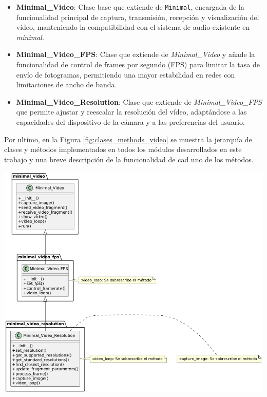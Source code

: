 \begin{itemize}
    \item \textbf{Minimal\_Video}: Clase base que extiende de \texttt{Minimal}, encargada de la funcionalidad principal de captura, transmisión, recepción y visualización del vídeo, manteniendo la compatibilidad con el sistema de audio existente en \textit{minimal}.
    \item \textbf{Minimal\_Video\_FPS}: Clase que extiende de \textit{Minimal\_Video} y añade la funcionalidad de control de frames por segundo (FPS) para limitar la tasa de envío de fotogramas, permitiendo una mayor estabilidad en redes con limitaciones de ancho de banda.
    \item \textbf{Minimal\_Video\_Resolution}: Clase que extiende de \textit{Minimal\_Video\_FPS} que permite ajustar y reescalar la resolución del vídeo, adaptándose a las capacidades del dispositivo de la cámara y a las preferencias del usuario.
\end{itemize}
\vspace{\baselineskip}

Por ultimo, en la Figura \ref{fig:clases_methods_video} se muestra la jerarquía de clases y métodos implementados en todos los módulos desarrollados en este trabajo y una breve descripción de la funcionalidad de cad uno de los métodos.
\begin{center}
    \includegraphics[width = 1\textwidth]{images/uml.png}
    \label{fig:clases_methods_video}
\end{center}

